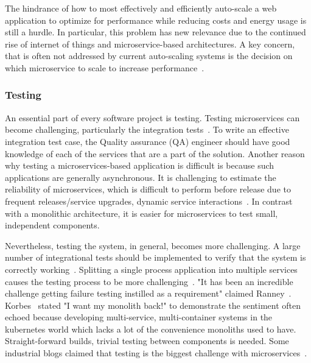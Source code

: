 \par The hindrance of how to most effectively and efficiently auto-scale a web application to optimize for performance while reducing costs and energy usage is still a hurdle. In particular, this problem has new relevance due to the continued rise of internet of things and microservice-based architectures. A key concern, that is often not addressed by current auto-scaling systems is the decision on which microservice to scale to increase performance~\cite{coulson2020}.



\subsubsection{Testing}%

An essential part of every software project is testing. Testing microservices can become challenging, particularly the integration tests~\cite{Dmitrii2019}. To write an effective integration test case, the Quality assurance (QA) engineer should have good knowledge of each of the services that are a part of the solution. Another reason why testing a microservices-based application is difficult is because such applications are generally asynchronous. It is challenging to estimate the reliability of microservices, which is difficult to perform before release due to frequent releases/service upgrades, dynamic service interactions~\cite{Russo2020}. In contrast with a monolithic architecture, it is easier for microservices to test small, independent components. 

\par Nevertheless, testing the system, in general, becomes more challenging. A large number of integrational tests should be implemented to verify that the system is correctly working~\cite{Zaytev2018}. Splitting a single process application into multiple services causes the testing process to be more challenging~\cite{Huttunen2017}. 
"It has been an incredible challenge getting failure testing instilled as a requirement" claimed Ranney~\cite{Matt2016}. 
%
Korbes~\cite{Ellen2018} stated "I want my monolith back!" to demonstrate the sentiment often echoed because developing multi-service, multi-container systems in the kubernetes world which lacks a lot of the convenience monoliths used to have.
Straight-forward builds, trivial testing between components is needed. Some industrial blogs claimed that testing is the biggest challenge with microservices~\cite{Karma, Soundcloud}.



